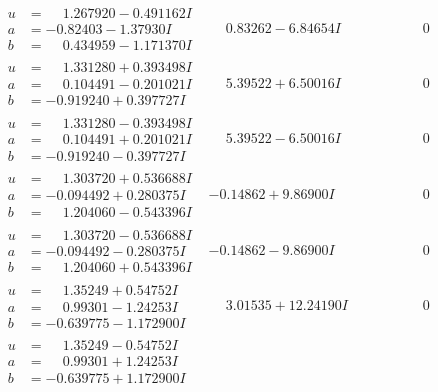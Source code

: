 \documentclass[1p]{elsarticle_modified}
\theoremstyle{definition}
\begin{document}
$$\begin{array}{c|c|c}
\begin{aligned}
u &= \phantom{-}1.267920 - 0.491162 I \\
a &= -0.82403 - 1.37930 I \\
b &= \phantom{-}0.434959 - 1.171370 I\end{aligned}
 & \phantom{-}0.83262 - 6.84654 I & \phantom{-0.000000 } 0 \\ \hline\begin{aligned}
u &= \phantom{-}1.331280 + 0.393498 I \\
a &= \phantom{-}0.104491 - 0.201021 I \\
b &= -0.919240 + 0.397727 I\end{aligned}
 & \phantom{-}5.39522 + 6.50016 I & \phantom{-0.000000 } 0 \\ \hline\begin{aligned}
u &= \phantom{-}1.331280 - 0.393498 I \\
a &= \phantom{-}0.104491 + 0.201021 I \\
b &= -0.919240 - 0.397727 I\end{aligned}
 & \phantom{-}5.39522 - 6.50016 I & \phantom{-0.000000 } 0 \\ \hline\begin{aligned}
u &= \phantom{-}1.303720 + 0.536688 I \\
a &= -0.094492 + 0.280375 I \\
b &= \phantom{-}1.204060 - 0.543396 I\end{aligned}
 & -0.14862 + 9.86900 I & \phantom{-0.000000 } 0 \\ \hline\begin{aligned}
u &= \phantom{-}1.303720 - 0.536688 I \\
a &= -0.094492 - 0.280375 I \\
b &= \phantom{-}1.204060 + 0.543396 I\end{aligned}
 & -0.14862 - 9.86900 I & \phantom{-0.000000 } 0 \\ \hline\begin{aligned}
u &= \phantom{-}1.35249 + 0.54752 I \\
a &= \phantom{-}0.99301 - 1.24253 I \\
b &= -0.639775 - 1.172900 I\end{aligned}
 & \phantom{-}3.01535 + 12.24190 I & \phantom{-0.000000 } 0 \\ \hline\begin{aligned}
u &= \phantom{-}1.35249 - 0.54752 I \\
a &= \phantom{-}0.99301 + 1.24253 I \\
b &= -0.639775 + 1.172900 I\end{aligned}

\end{array}$$
\end{document}
